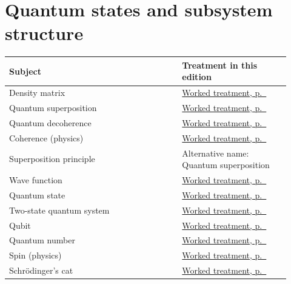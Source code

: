 \documentclass[11pt,oneside]{book}
\begin{document}
\section*{Quantum states and subsystem structure}
\begin{longtable}{p{0.57\linewidth}p{0.35\linewidth}}
\toprule Subject & Treatment in this edition \\
\midrule\endhead
{}\label{index:density-matrix}Density matrix & \hyperref[topic:density-matrix]{Worked treatment, p.~\pageref*{topic:density-matrix}} \\
\label{index:quantum-superposition}Quantum superposition & \hyperref[topic:quantum-superposition]{Worked treatment, p.~\pageref*{topic:quantum-superposition}} \\
\label{index:quantum-decoherence}Quantum decoherence & \hyperref[topic:quantum-decoherence]{Worked treatment, p.~\pageref*{topic:quantum-decoherence}} \\
\label{index:coherence-physics}Coherence (physics) & \hyperref[topic:coherence-physics]{Worked treatment, p.~\pageref*{topic:coherence-physics}} \\
\label{index:superposition-principle}Superposition principle & Alternative name: Quantum superposition \\
\label{index:wave-function}Wave function & \hyperref[topic:wave-function]{Worked treatment, p.~\pageref*{topic:wave-function}} \\
\label{index:quantum-state}Quantum state & \hyperref[topic:quantum-state]{Worked treatment, p.~\pageref*{topic:quantum-state}} \\
\label{index:two-state-quantum-system}Two-state quantum system & \hyperref[topic:two-state-quantum-system]{Worked treatment, p.~\pageref*{topic:two-state-quantum-system}} \\
\label{index:qubit}Qubit & \hyperref[topic:qubit]{Worked treatment, p.~\pageref*{topic:qubit}} \\
\label{index:quantum-number}Quantum number & \hyperref[topic:quantum-number]{Worked treatment, p.~\pageref*{topic:quantum-number}} \\
\label{index:spin-physics}Spin (physics) & \hyperref[topic:spin-physics]{Worked treatment, p.~\pageref*{topic:spin-physics}} \\
\label{index:schr-dinger-s-cat}Schrödinger's cat & \hyperref[topic:schr-dinger-s-cat]{Worked treatment, p.~\pageref*{topic:schr-dinger-s-cat}} \\

\end{longtable}
\end{document}
